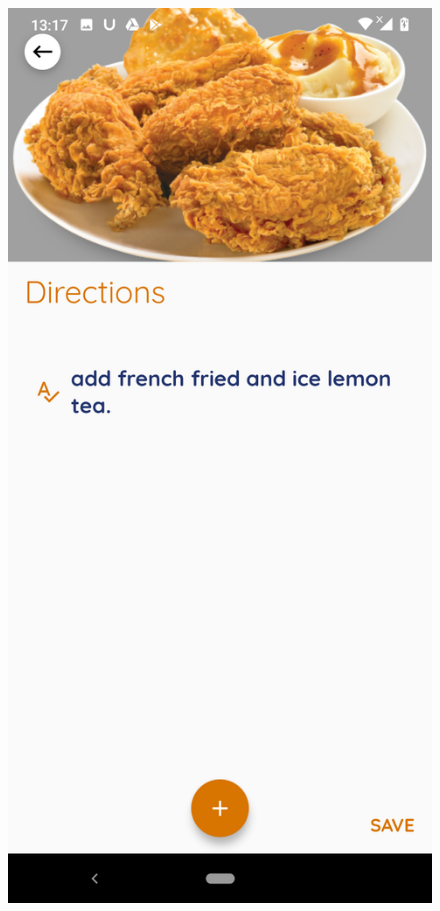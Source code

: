 \documentclass{article}
\begin{document}
\begin{figure}[h!]
        \includegraphics[scale=0.1]{Images/firechick_direc.jpg}

\end{figure}
\end{document}
